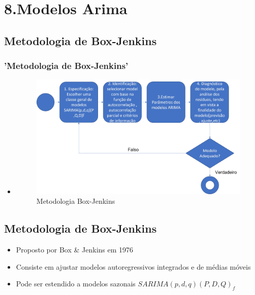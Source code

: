 \documentclass{beamer}
\begin{document}

\section{8.Modelos Arima}
\subsection{Metodologia de Box-Jenkins}
\begin{frame}
	\frametitle{'Metodologia de Box-Jenkins'} 
	\begin{itemize}
		\item<1->\begin{figure}
			\centering
			\caption{Metodologia Box-Jenkins}
			\label{fig:boxjenkinsmethodology}
			\includegraphics[width=0.7\linewidth]{apresentacao_series_temporais/images/box_jenkins_methodology}
		\end{figure}
		
	\end{itemize}
\end{frame}
\subsection{Metodologia de Box-Jenkins}
\begin{frame}
	\begin{itemize}
		\item<1-> Proposto por Box \& Jenkins em 1976 
		\item<1-> Consiste em ajustar modelos autoregressivos integrados e de médias móveis
		\item<1-> Pode ser estendido a modelos sazonais $SARIMA(p,d,q)(P,D,Q)_{f}$
		
	\end{itemize}
\end{frame}
\end{document}
